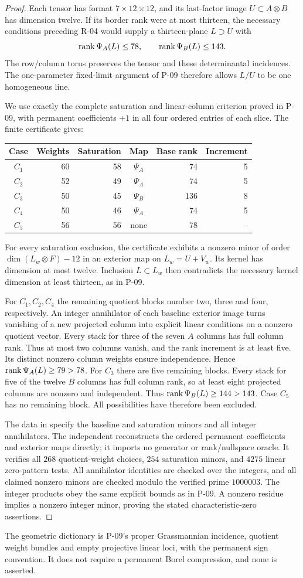 \begin{proof}
Each tensor has format $7\times12\times12$, and its last-factor
image $U\subset A\otimes B$ has dimension twelve. If its border
rank were at most thirteen, the necessary conditions preceding
R-04 would supply a thirteen-plane $L\supset U$ with
\[
 \operatorname{rank}\Psi_A(L)\leq78,\qquad\operatorname{rank}\Psi_B(L)\leq143.
\]
The row/column torus preserves the tensor and these determinantal
incidences. The one-parameter fixed-limit argument of P-09 therefore
allows $L/U$ to be one homogeneous line.

We use exactly the complete saturation and linear-column criterion
proved in P-09, with permanent coefficients $+1$ in all four
ordered entries of each slice. The finite certificate gives:
\begin{center}
\begin{tabular}{c|r|r|c|r|r}
Case & Weights & Saturation & Map
 & Base rank & Increment\\\hline
$C_1$ &60&58&$\Psi_A$&74&5\\
$C_2$ &52&49&$\Psi_A$&74&5\\
$C_3$ &50&45&$\Psi_B$&136&8\\
$C_4$ &50&46&$\Psi_A$&74&5\\
$C_5$ &56&56&none&78&--
\end{tabular}
\end{center}
For every saturation exclusion, the certificate exhibits a nonzero
minor of order $\dim(L_w\otimes F)-12$ in an exterior map on
$L_w=U+V_w$. Its kernel has dimension at most twelve. Inclusion
$L\subset L_w$ then contradicts the necessary kernel dimension
at least thirteen, as in P-09.

For $C_1,C_2,C_4$ the remaining quotient blocks number two,
three and four, respectively. An integer annihilator of each
baseline exterior image turns vanishing of a new projected
column into explicit linear conditions on a nonzero quotient
vector. Every stack for three of the seven $A$ columns has
full column rank. Thus at most two columns vanish, and the
rank increment is at least five. Its distinct nonzero column
weights ensure independence. Hence $\operatorname{rank}\Psi_A(L)\geq79>78$.
For $C_3$ there are five remaining blocks. Every stack for
five of the twelve $B$ columns has full column rank, so at
least eight projected columns are nonzero and independent.
Thus $\operatorname{rank}\Psi_B(L)\geq144>143$.
Case $C_5$ has no remaining block. All possibilities have
therefore been excluded.

The data in  specify the
baseline and saturation minors and all integer annihilators.
The independent 
reconstructs the ordered permanent coefficients and exterior
maps directly; it imports no generator or rank/nullspace oracle.
It verifies all $268$ quotient-weight choices, $254$ saturation
minors, and $4275$ linear zero-pattern tests. All annihilator
identities are checked over the integers, and all claimed
nonzero minors are checked modulo the verified prime $1000003$.
The integer products obey the same explicit bounds as in P-09.
A nonzero residue implies a nonzero integer minor, proving
the stated characteristic-zero assertions.
\end{proof}

The geometric dictionary is P-09's proper Grassmannian incidence,
quotient weight bundles and empty projective linear loci, with the
permanent sign convention. It does not require a permanent Borel
compression, and none is asserted.
